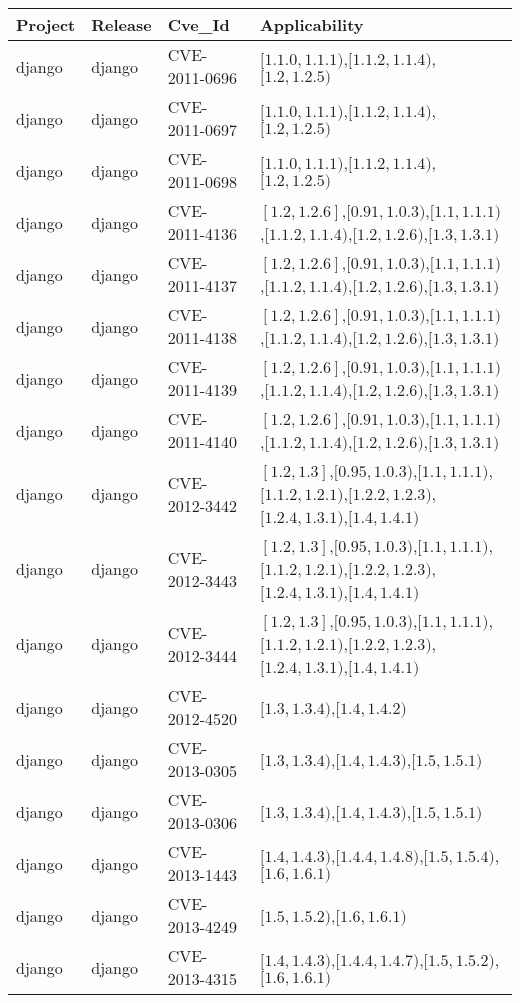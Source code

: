 \begin{tabular}{llll}
\toprule
Project & Release & Cve_Id & Applicability \\
\midrule
django & django & CVE-2011-0696 & $[1.1.0,1.1.1)$,$[1.1.2,1.1.4)$,$[1.2,1.2.5)$ \\
django & django & CVE-2011-0697 & $[1.1.0,1.1.1)$,$[1.1.2,1.1.4)$,$[1.2,1.2.5)$ \\
django & django & CVE-2011-0698 & $[1.1.0,1.1.1)$,$[1.1.2,1.1.4)$,$[1.2,1.2.5)$ \\
django & django & CVE-2011-4136 & $[1.2,1.2.6]$,$[0.91,1.0.3)$,$[1.1,1.1.1)$,$[1.1.2,1.1.4)$,$[1.2,1.2.6)$,$[1.3,1.3.1)$ \\
django & django & CVE-2011-4137 & $[1.2,1.2.6]$,$[0.91,1.0.3)$,$[1.1,1.1.1)$,$[1.1.2,1.1.4)$,$[1.2,1.2.6)$,$[1.3,1.3.1)$ \\
django & django & CVE-2011-4138 & $[1.2,1.2.6]$,$[0.91,1.0.3)$,$[1.1,1.1.1)$,$[1.1.2,1.1.4)$,$[1.2,1.2.6)$,$[1.3,1.3.1)$ \\
django & django & CVE-2011-4139 & $[1.2,1.2.6]$,$[0.91,1.0.3)$,$[1.1,1.1.1)$,$[1.1.2,1.1.4)$,$[1.2,1.2.6)$,$[1.3,1.3.1)$ \\
django & django & CVE-2011-4140 & $[1.2,1.2.6]$,$[0.91,1.0.3)$,$[1.1,1.1.1)$,$[1.1.2,1.1.4)$,$[1.2,1.2.6)$,$[1.3,1.3.1)$ \\
django & django & CVE-2012-3442 & $[1.2,1.3]$,$[0.95,1.0.3)$,$[1.1,1.1.1)$,$[1.1.2,1.2.1)$,$[1.2.2,1.2.3)$,$[1.2.4,1.3.1)$,$[1.4,1.4.1)$ \\
django & django & CVE-2012-3443 & $[1.2,1.3]$,$[0.95,1.0.3)$,$[1.1,1.1.1)$,$[1.1.2,1.2.1)$,$[1.2.2,1.2.3)$,$[1.2.4,1.3.1)$,$[1.4,1.4.1)$ \\
django & django & CVE-2012-3444 & $[1.2,1.3]$,$[0.95,1.0.3)$,$[1.1,1.1.1)$,$[1.1.2,1.2.1)$,$[1.2.2,1.2.3)$,$[1.2.4,1.3.1)$,$[1.4,1.4.1)$ \\
django & django & CVE-2012-4520 & $[1.3,1.3.4)$,$[1.4,1.4.2)$ \\
django & django & CVE-2013-0305 & $[1.3,1.3.4)$,$[1.4,1.4.3)$,$[1.5,1.5.1)$ \\
django & django & CVE-2013-0306 & $[1.3,1.3.4)$,$[1.4,1.4.3)$,$[1.5,1.5.1)$ \\
django & django & CVE-2013-1443 & $[1.4,1.4.3)$,$[1.4.4,1.4.8)$,$[1.5,1.5.4)$,$[1.6,1.6.1)$ \\
django & django & CVE-2013-4249 & $[1.5,1.5.2)$,$[1.6,1.6.1)$ \\
django & django & CVE-2013-4315 & $[1.4,1.4.3)$,$[1.4.4,1.4.7)$,$[1.5,1.5.2)$,$[1.6,1.6.1)$ \\

\end{tabular}

